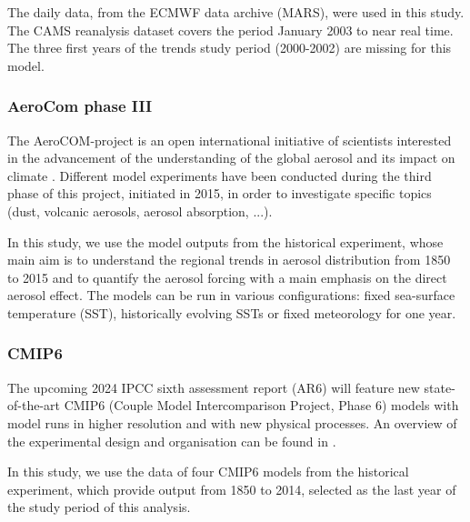 \documentclass[journal abbreviation, manuscript]{copernicus}
\begin{document}
The daily data, from the ECMWF data archive (MARS), were used in this study. The CAMS reanalysis dataset covers the period January 2003 to near real time. The three first years of the trends study period (2000-2002) are missing for this model.

\subsubsection{AeroCom phase III}
The AeroCOM-project is an open international initiative of scientists interested in the advancement of the understanding of the global aerosol and its impact on climate \citep{schulz2006radiative}. Different model experiments have been conducted during the third phase of this project, initiated in 2015, in order to investigate specific topics (dust, volcanic aerosols, aerosol absorption, ...). 

In this study, we use the model outputs from the historical experiment, whose main aim is to understand the regional trends in aerosol distribution from 1850 to 2015 and to quantify the aerosol forcing with a main emphasis on the direct aerosol effect. The models can be run in various configurations: fixed sea-surface temperature (SST), historically evolving SSTs or fixed meteorology for one year. 

\subsubsection{CMIP6}
The upcoming 2024 IPCC sixth assessment report (AR6) will feature new state-of-the-art CMIP6 (Couple Model Intercomparison Project, Phase 6) models with model runs in higher resolution and with new physical processes. An overview of the experimental design and organisation can be found in \cite{eyring2016overview}. 

In this study, we use the data of four CMIP6 models from the historical experiment, which provide output from 1850 to 2014, selected as the last year of the study period of this analysis.
\end{document}
